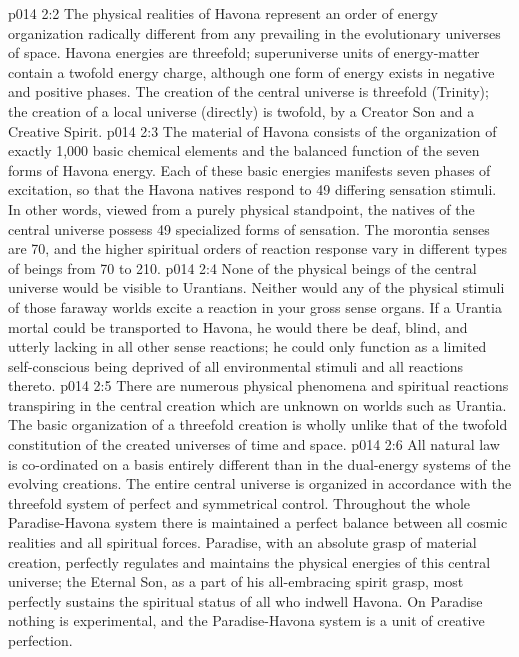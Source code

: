 \vs p014 2:2 The physical realities of Havona represent an order of energy organization radically different from any prevailing in the evolutionary universes of space. Havona energies are threefold; superuniverse units of energy\hyp{}matter contain a twofold energy charge, although one form of energy exists in negative and positive phases. The creation of the central universe is threefold (Trinity); the creation of a local universe (directly) is twofold, by a Creator Son and a Creative Spirit.
\vs p014 2:3 The material of Havona consists of the organization of exactly 1,000 basic chemical elements and the balanced function of the seven forms of Havona energy. Each of these basic energies manifests seven phases of excitation, so that the Havona natives respond to 49 differing sensation stimuli. In other words, viewed from a purely physical standpoint, the natives of the central universe possess 49 specialized forms of sensation. The morontia senses are 70, and the higher spiritual orders of reaction response vary in different types of beings from 70 to 210.
\vs p014 2:4 None of the physical beings of the central universe would be visible to Urantians. Neither would any of the physical stimuli of those faraway worlds excite a reaction in your gross sense organs. If a Urantia mortal could be transported to Havona, he would there be deaf, blind, and utterly lacking in all other sense reactions; he could only function as a limited self\hyp{}conscious being deprived of all environmental stimuli and all reactions thereto.
\vs p014 2:5 \pc There are numerous physical phenomena and spiritual reactions transpiring in the central creation which are unknown on worlds such as Urantia. The basic organization of a threefold creation is wholly unlike that of the twofold constitution of the created universes of time and space.
\vs p014 2:6 All natural law is co\hyp{}ordinated on a basis entirely different than in the dual\hyp{}energy systems of the evolving creations. The entire central universe is organized in accordance with the threefold system of perfect and symmetrical control. Throughout the whole Paradise\hyp{}Havona system there is maintained a perfect balance between all cosmic realities and all spiritual forces. Paradise, with an absolute grasp of material creation, perfectly regulates and maintains the physical energies of this central universe; the Eternal Son, as a part of his all\hyp{}embracing spirit grasp, most perfectly sustains the spiritual status of all who indwell Havona. On Paradise nothing is experimental, and the Paradise\hyp{}Havona system is a unit of creative perfection.
